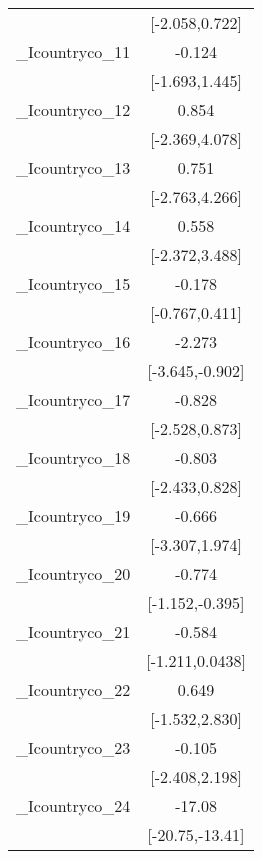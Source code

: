 {\begin{tabular}{l*{1}{c}}
            &        [-2.058,0.722]         \\
[1em]
\_Icountryco\_11&                -0.124         \\
            &        [-1.693,1.445]         \\
[1em]
\_Icountryco\_12&                 0.854         \\
            &        [-2.369,4.078]         \\
[1em]
\_Icountryco\_13&                 0.751         \\
            &        [-2.763,4.266]         \\
[1em]
\_Icountryco\_14&                 0.558         \\
            &        [-2.372,3.488]         \\
[1em]
\_Icountryco\_15&                -0.178         \\
            &        [-0.767,0.411]         \\
[1em]
\_Icountryco\_16&                -2.273\sym{**} \\
            &       [-3.645,-0.902]         \\
[1em]
\_Icountryco\_17&                -0.828         \\
            &        [-2.528,0.873]         \\
[1em]
\_Icountryco\_18&                -0.803         \\
            &        [-2.433,0.828]         \\
[1em]
\_Icountryco\_19&                -0.666         \\
            &        [-3.307,1.974]         \\
[1em]
\_Icountryco\_20&                -0.774\sym{***}\\
            &       [-1.152,-0.395]         \\
[1em]
\_Icountryco\_21&                -0.584         \\
            &       [-1.211,0.0438]         \\
[1em]
\_Icountryco\_22&                 0.649         \\
            &        [-1.532,2.830]         \\
[1em]
\_Icountryco\_23&                -0.105         \\
            &        [-2.408,2.198]         \\
[1em]
\_Icountryco\_24&                -17.08\sym{***}\\
            &       [-20.75,-13.41]         \\

\end{tabular}}
